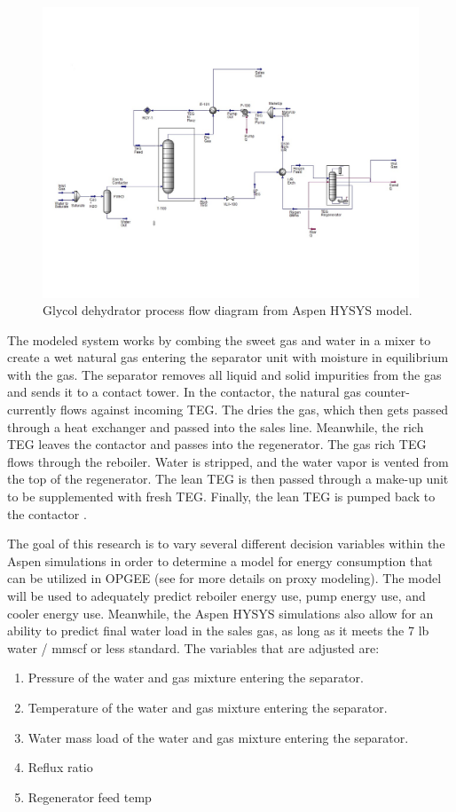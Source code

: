 \documentclass[11pt]{report}
\begin{document}
\begin{figure}[t]
\includegraphics[width=1.1\columnwidth]{images/DehydrationPFD.pdf}
\caption{Glycol dehydrator process flow diagram from Aspen HYSYS model.}
\label{fig:dehyPFDaspen}
\end{figure}

The modeled system works by combing the sweet gas and water in a mixer to create a wet natural gas entering the separator unit with moisture in equilibrium with the gas. The separator removes all liquid and solid impurities from the gas and sends it to a contact tower. In the contactor, the natural gas counter-currently flows against incoming TEG. The dries the gas, which then gets passed through a heat exchanger and passed into the sales line. Meanwhile, the rich TEG leaves the contactor and passes into the regenerator. The gas rich TEG flows through the reboiler. Water is stripped, and the water vapor is vented from the top of the regenerator. The lean TEG is then passed through a make-up unit to be supplemented with fresh TEG. Finally, the lean TEG is pumped back to the contactor \cite{Manning1991}. 

The goal of this research is to vary several different decision variables within the Aspen simulations in order to determine a model for energy consumption that can be utilized in OPGEE (see \cite{Masnadi2020} for more details on proxy modeling). The model will be used to adequately predict reboiler energy use, pump energy use, and cooler energy use. Meanwhile, the Aspen HYSYS simulations also allow for an ability to predict final water load in the sales gas, as long as it meets the 7 lb water / mmscf or less standard. The variables that are adjusted are:
\begin{enumerate}
\item Pressure of the water and gas mixture entering the separator. 
\item Temperature of the water and gas mixture entering the separator.
\item Water mass load of the water and gas mixture entering the separator.
\item Reflux ratio
\item Regenerator feed temp
\end{enumerate}
\end{document}
